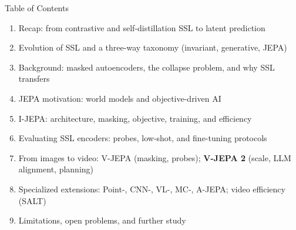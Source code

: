 \begin{frame}{Table of Contents}
  \begin{enumerate}\itemsep0.15em
    \item Recap: from contrastive and self-distillation SSL to latent prediction
    \item Evolution of SSL and a three-way taxonomy (invariant, generative, JEPA)
    \item Background: masked autoencoders, the collapse problem, and why SSL transfers
    \item JEPA motivation: world models and objective-driven AI
    \item I-JEPA: architecture, masking, objective, training, and efficiency
    \item Evaluating SSL encoders: probes, low-shot, and fine-tuning protocols
    \item From images to video: V-JEPA (masking, probes); \textbf{V-JEPA 2} (scale, LLM alignment, planning)
    \item Specialized extensions: Point-, CNN-, VL-, MC-, A-JEPA; video efficiency (SALT)
    \item Limitations, open problems, and further study
  \end{enumerate}
\end{frame}
